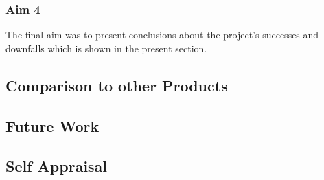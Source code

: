 		\subsubsection{Aim 4}
			The final aim was to present conclusions about the project's successes and downfalls which is shown in the present section.
	\subsection{Comparison to other Products}
	\subsection{Future Work}\label{sec:conclusion_future_work}
	\subsection{Self Appraisal}
